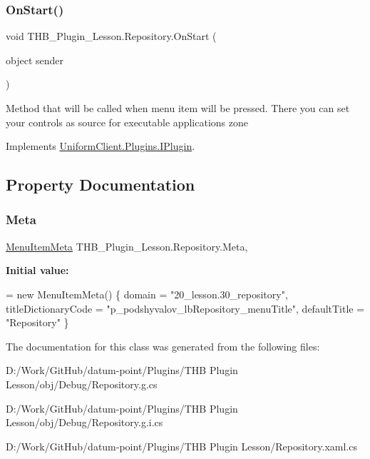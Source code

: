 \subsubsection{\texorpdfstring{On\+Start()}{OnStart()}}
{\footnotesize\ttfamily void T\+H\+B\+\_\+\+Plugin\+\_\+\+Lesson.\+Repository.\+On\+Start (\begin{DoxyParamCaption}\item[{object}]{sender }\end{DoxyParamCaption})}



Method that will be called when menu item will be pressed. There you can set your controls as source for executable application\textquotesingle{}s zone 



Implements \mbox{\hyperlink{interface_uniform_client_1_1_plugins_1_1_i_plugin_a1ca2220c7ce4a23f8f41af10efccf328}{Uniform\+Client.\+Plugins.\+I\+Plugin}}.



\subsection{Property Documentation}
\mbox{\label{class_t_h_b___plugin___lesson_1_1_repository_aa8951c83aac524f207e3b97c83fa226e}} 
\subsubsection{\texorpdfstring{Meta}{Meta}}
{\footnotesize\ttfamily \mbox{\hyperlink{class_uniform_client_1_1_plugins_1_1_menu_item_meta}{Menu\+Item\+Meta}} T\+H\+B\+\_\+\+Plugin\+\_\+\+Lesson.\+Repository.\+Meta\hspace{0.3cm}{\ttfamily [get]}, {\ttfamily [set]}}

{\bfseries Initial value\+:}
\begin{DoxyCode}
= \textcolor{keyword}{new} MenuItemMeta()
        \{
            domain = \textcolor{stringliteral}{"20\_lesson.30\_repository"},
            titleDictionaryCode = \textcolor{stringliteral}{"p\_podshyvalov\_lbRepository\_menuTitle"},
            defaultTitle = \textcolor{stringliteral}{"Repository"}
        \}
\end{DoxyCode}


The documentation for this class was generated from the following files\+:\begin{DoxyCompactItemize}
\item 
D\+:/\+Work/\+Git\+Hub/datum-\/point/\+Plugins/\+T\+H\+B Plugin Lesson/obj/\+Debug/Repository.\+g.\+cs\item 
D\+:/\+Work/\+Git\+Hub/datum-\/point/\+Plugins/\+T\+H\+B Plugin Lesson/obj/\+Debug/Repository.\+g.\+i.\+cs\item 
D\+:/\+Work/\+Git\+Hub/datum-\/point/\+Plugins/\+T\+H\+B Plugin Lesson/Repository.\+xaml.\+cs\end{DoxyCompactItemize}
